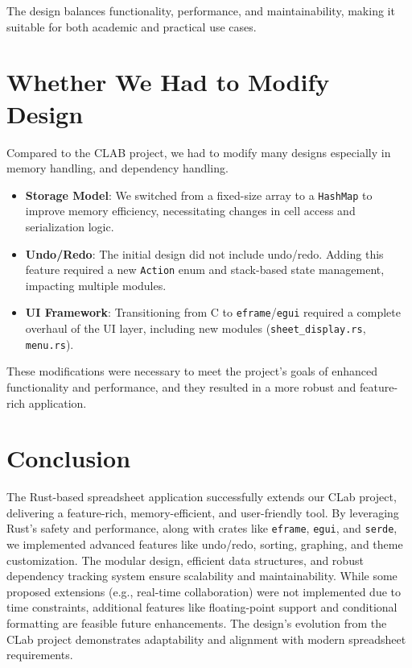 \documentclass{article}
\begin{document}
The design balances functionality, performance, and maintainability, making it suitable for both academic and practical use cases.

\section{Whether We Had to Modify Design}
Compared to the CLAB project, we had to modify many designs especially in memory handling, and dependency handling. 

\begin{itemize}
    \item \textbf{Storage Model}: We switched from a fixed-size array to a \texttt{HashMap} to improve memory efficiency, necessitating changes in cell access and serialization logic.
    \item \textbf{Undo/Redo}: The initial design did not include undo/redo. Adding this feature required a new \texttt{Action} enum and stack-based state management, impacting multiple modules.
    \item \textbf{UI Framework}: Transitioning from C to \texttt{eframe}/\texttt{egui} required a complete overhaul of the UI layer, including new modules (\texttt{sheet\_display.rs}, \texttt{menu.rs}).
\end{itemize}

These modifications were necessary to meet the project’s goals of enhanced functionality and performance, and they resulted in a more robust and feature-rich application.

\section{Conclusion}
The Rust-based spreadsheet application successfully extends our CLab project, delivering a feature-rich, memory-efficient, and user-friendly tool. By leveraging Rust’s safety and performance, along with crates like \texttt{eframe}, \texttt{egui}, and \texttt{serde}, we implemented advanced features like undo/redo, sorting, graphing, and theme customization. The modular design, efficient data structures, and robust dependency tracking system ensure scalability and maintainability. While some proposed extensions (e.g., real-time collaboration) were not implemented due to time constraints, additional features like floating-point support and conditional formatting are feasible future enhancements. The design’s evolution from the CLab project demonstrates adaptability and alignment with modern spreadsheet requirements.
\end{document}
